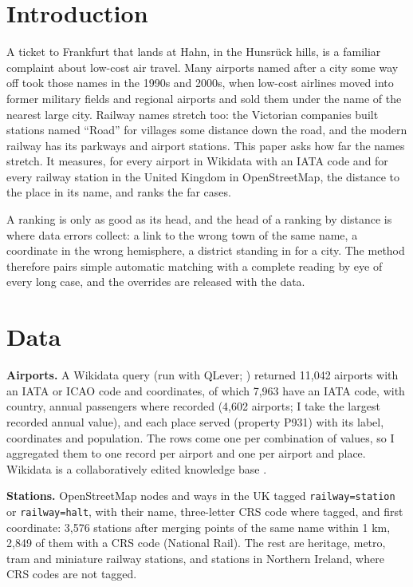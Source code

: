 \documentclass[11pt,a4paper]{article}
\begin{document}
\section{Introduction}
A ticket to Frankfurt that lands at Hahn, in the Hunsrück hills, is a familiar complaint about low-cost air travel. Many airports named after a city some way off took those names in the 1990s and 2000s, when low-cost airlines moved into former military fields and regional airports and sold them under the name of the nearest large city. Railway names stretch too: the Victorian companies built stations named ``Road'' for villages some distance down the road, and the modern railway has its parkways and airport stations. This paper asks how far the names stretch. It measures, for every airport in Wikidata with an IATA code and for every railway station in the United Kingdom in OpenStreetMap, the distance to the place in its name, and ranks the far cases.

A ranking is only as good as its head, and the head of a ranking by distance is where data errors collect: a link to the wrong town of the same name, a coordinate in the wrong hemisphere, a district standing in for a city. The method therefore pairs simple automatic matching with a complete reading by eye of every long case, and the overrides are released with the data.

\section{Data}
\textbf{Airports.} A Wikidata query (run with QLever; \citealt{bast2017}) returned 11,042 airports with an IATA or ICAO code and coordinates, of which 7,963 have an IATA code, with country, annual passengers where recorded (4,602 airports; I take the largest recorded annual value), and each place served (property P931) with its label, coordinates and population. The rows come one per combination of values, so I aggregated them to one record per airport and one per airport and place. Wikidata is a collaboratively edited knowledge base \citep{vrandecic2014}.

\textbf{Stations.} OpenStreetMap \citep{haklay2008} nodes and ways in the UK tagged \texttt{railway=station} or \texttt{railway=halt}, with their name, three-letter CRS code where tagged, and first coordinate: 3,576 stations after merging points of the same name within 1 km, 2,849 of them with a CRS code (National Rail). The rest are heritage, metro, tram and miniature railway stations, and stations in Northern Ireland, where CRS codes are not tagged.
\end{document}
